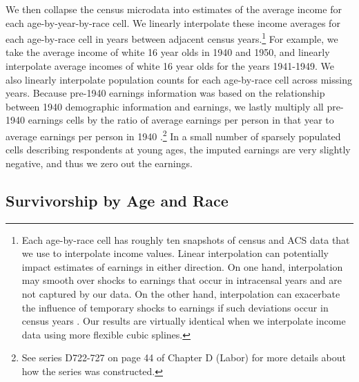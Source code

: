 \documentclass[12pt]{article}
\begin{document}
We then collapse the census microdata into estimates of the average income for each age-by-year-by-race cell. 
We linearly interpolate these income averages for each age-by-race cell in years between adjacent census years.\footnote{Each age-by-race cell has roughly ten snapshots of census and ACS data that we use to interpolate income values. 
Linear interpolation can potentially impact estimates of earnings in either direction. 
On one hand, interpolation may smooth over shocks to earnings that occur in intracensal years and are not captured by our data. 
On the other hand, interpolation can exacerbate the influence of temporary shocks to earnings if such deviations occur in census years .
Our results are virtually identical when we interpolate income data using more flexible cubic splines.} 
For example, we take the average income of white 16 year olds in 1940 and 1950, and linearly interpolate average incomes of white 16 year olds for the years 1941-1949. 
We also linearly interpolate population counts for each age-by-race cell across missing years. 
Because pre-1940 earnings information was based on the relationship between 1940 demographic information and earnings, we lastly multiply all pre-1940 earnings cells by the ratio of average earnings per person in that year to average earnings per person in 1940 .\footnote{See series D722-727 on page 44 of Chapter D (Labor) for more details about how the series was constructed.} 
In a small number of sparsely populated cells describing respondents at young ages, the imputed earnings are very slightly negative, and thus we zero out the earnings.

\subsection{Survivorship by Age and Race\label{sec:survivorship}}
\end{document}
